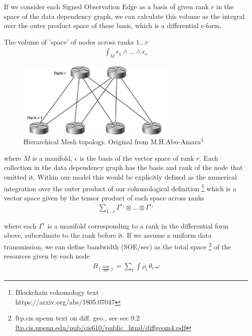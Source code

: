 \documentclass{article}
\begin{document}
If we consider each Signed Observation Edge as a basis of given rank $r$ in the space of the data dependency graph, we can calculate this volume as the integral over the outer product space of these basis, which is a differential r-form.

The volume of 'space' of nodes across ranks $1 \dots r$
\begin{equation*} \label{eq1}
\begin{split}
\int_M \epsilon_1 \wedge \dots \wedge \epsilon_r
\end{split}
\end{equation*}

\begin{figure}[h]
\centering
\includegraphics[width=8cm]{Designing_a_network_topology-M_H_Abu-Amara}
\caption{Hierarchical Mesh topology. Original from M.H.Abu-Amara$^3$}%
\end{figure}

where $M$ is a manifold, $\epsilon$ is the basis of the vector space of rank $r$. Each collection in the data dependency graph has the basis and rank of the node that emitted it. Within our model this would be explicitly defined as the numerical integration over the outer product of our cohomological definition
\footnote{Blockchain cohomology text\\ https://arxiv.org/abs/1805.07047} 
which is a vector space given by the tensor product of each space across ranks
\begin{equation*} \label{eq1}
\begin{split}
\sum_{1 \dots r} \Gamma^{\epsilon_1} \otimes \dots \otimes \Gamma^{\epsilon_r}
\end{split}
\end{equation*}

where each $\Gamma^{\epsilon}$ is a manifold corresponding to a rank in the differential form above, subordinate to the rank before it. If we assume a uniform data transmission, we can define bandwidth (SOE/sec) as the total space
\footnote{ftp.cis.upenn text on diff. geo., see sec 9.2\\ \url{ftp.cis.upenn.edu/pub/cis610/public_html/diffgeom4.pdf}} 
of the resources given by each node
\begin{equation*} \label{eq1}
\begin{split}
B_{(\frac{\mathrm{SOE}}{\mathrm{sec}})} = \sum_{r} \int \rho_i\, \theta_i\, \omega
\end{split}
\end{equation*}
\end{document}
